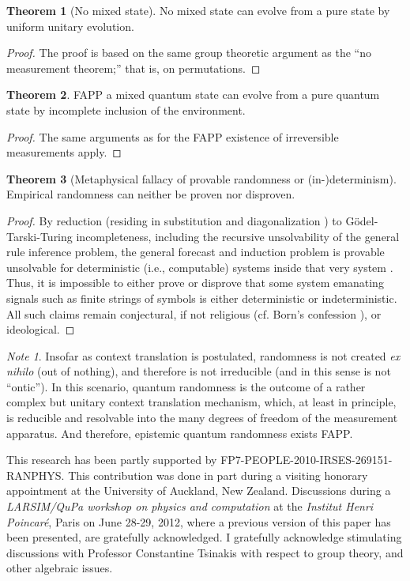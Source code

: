 \documentclass[%
  preprint,
 showpacs,
 showkeys,
 preprintnumbers,
 amsmath,amssymb,
 aps,
 prl,
  longbibliography,
 ]{revtex4-1}
\theoremstyle{definition}
\newtheorem{theorem}{Theorem}
\theoremstyle{remark}
\newtheorem*{note}{Note}
\begin{document}
\begin{theorem}[No mixed state]
No mixed  state can evolve from a pure state by uniform unitary evolution.
\end{theorem}
\begin{proof}
The proof is based on the same group theoretic argument as the ``no measurement theorem;''
that is, on permutations.
\end{proof}

\begin{theorem}
FAPP a mixed quantum state can evolve from a pure quantum state by incomplete inclusion of the environment.
\end{theorem}
\begin{proof}
The same arguments as for the FAPP existence of irreversible measurements apply.
\end{proof}


\begin{theorem}[Metaphysical fallacy of provable randomness or (in-)determinism]
Empirical randomness can neither be proven nor disproven.
\end{theorem}
\begin{proof}
By reduction (residing in substitution and diagonalization \cite{smullyan-92})
to G\"odel-Tarski-Turing incompleteness, including the recursive unsolvability
of the general rule inference problem,
the general forecast and induction problem
is provable unsolvable for deterministic
(i.e., computable) systems inside that very system \cite{svozil-07-physical_unknowables}.
Thus, it is impossible to either prove or disprove that some system emanating signals such as finite strings of symbols
is either deterministic or indeterministic.
All such claims remain conjectural,
if not religious (cf. Born's confession
\cite{born-26-1,born-26-2}), or ideological.
\end{proof}

\begin{note}
Insofar as context translation is postulated,
randomness is not created {\it ex nihilo} (out of nothing),
and therefore is not irreducible (and in this sense is not ``ontic'').
In this scenario, quantum randomness is the outcome of a rather complex but unitary context translation mechanism,
which, at least in principle, is reducible and resolvable into the many degrees of freedom of the measurement apparatus.
And therefore, epistemic quantum randomness exists FAPP.
\end{note}




\begin{acknowledgments}
 This research has been partly supported by FP7-PEOPLE-2010-IRSES-269151-RANPHYS.
This contribution was done in part during a visiting honorary appointment at the University of Auckland, New Zealand.
Discussions during a {\em LARSIM/QuPa workshop on physics and computation} at the {\it Institut Henri Poincar\'e}, Paris on June 28-29, 2012,
where a previous version of this paper has been presented, are gratefully acknowledged.
I gratefully acknowledge stimulating discussions with Professor Constantine Tsinakis with respect to group theory, and other algebraic issues.
\end{acknowledgments}

 
\end{document}
